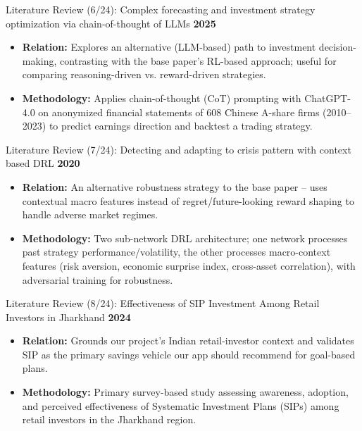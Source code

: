 \documentclass{beamer}
\begin{document}
\begin{frame}{Literature Review (6/24): Complex forecasting and investment strategy optimization via chain-of-thought of LLMs}
\small
\textbf{2025}
\begin{itemize}
    \item \textbf{Relation:} Explores an alternative (LLM-based) path to investment decision-making, contrasting with the base paper's RL-based approach; useful for comparing reasoning-driven vs. reward-driven strategies.
    \item \textbf{Methodology:} Applies chain-of-thought (CoT) prompting with ChatGPT-4.0 on anonymized financial statements of 608 Chinese A-share firms (2010--2023) to predict earnings direction and backtest a trading strategy.
\end{itemize}
\end{frame}

\begin{frame}{Literature Review (7/24): Detecting and adapting to crisis pattern with context based DRL}
\small
\textbf{2020}
\begin{itemize}
    \item \textbf{Relation:} An alternative robustness strategy to the base paper -- uses contextual macro features instead of regret/future-looking reward shaping to handle adverse market regimes.
    \item \textbf{Methodology:} Two sub-network DRL architecture; one network processes past strategy performance/volatility, the other processes macro-context features (risk aversion, economic surprise index, cross-asset correlation), with adversarial training for robustness.
\end{itemize}
\end{frame}

\begin{frame}{Literature Review (8/24): Effectiveness of SIP Investment Among Retail Investors in Jharkhand}
\small
\textbf{2024}
\begin{itemize}
    \item \textbf{Relation:} Grounds our project's Indian retail-investor context and validates SIP as the primary savings vehicle our app should recommend for goal-based plans.
    \item \textbf{Methodology:} Primary survey-based study assessing awareness, adoption, and perceived effectiveness of Systematic Investment Plans (SIPs) among retail investors in the Jharkhand region.
\end{itemize}
\end{frame}
\end{document}
